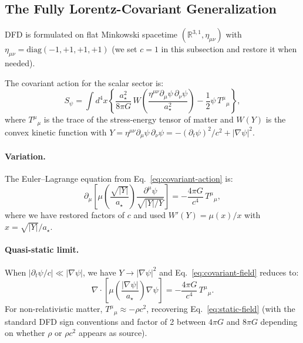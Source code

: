 \documentclass[aps,prd,twocolumn,superscriptaddress,nofootinbib]{revtex4-2}
\begin{document}
\subsection{The Fully Lorentz-Covariant Generalization}

DFD is formulated on flat Minkowski spacetime $(\mathbb{R}^{3,1},
\eta_{\mu\nu})$ with $\eta_{\mu\nu} = \mathrm{diag}(-1,+1,+1,+1)$
(we set $c=1$ in this subsection and restore it when needed).

The covariant action for the scalar sector is:
\begin{equation}\label{eq:covariant-action}
S_\psi = \int d^4x\left\{
  \frac{a_\star^2}{8\pi G}\,
  W\!\left(\frac{\eta^{\mu\nu}\partial_\mu\psi\,\partial_\nu\psi}
  {a_\star^2}\right)
  - \frac{1}{2}\psi\,T^\mu{}_\mu
\right\},
\end{equation}
where $T^\mu{}_\mu$ is the trace of the stress-energy tensor of matter
and $W(Y)$ is the convex kinetic function with $Y = \eta^{\mu\nu}
\partial_\mu\psi\,\partial_\nu\psi = -(\partial_t\psi)^2/c^2 +
|\nabla\psi|^2$.

\paragraph{Variation.} The Euler--Lagrange equation from
Eq.~\eqref{eq:covariant-action} is:
\begin{equation}\label{eq:covariant-field}
\boxed{
\partial_\mu\!\left[\mu\!\left(\frac{\sqrt{|Y|}}{a_\star}\right)
\frac{\partial^\mu\psi}{\sqrt{|Y|/Y}}\right]
= -\frac{4\pi G}{c^4}\,T^\mu{}_\mu,
}
\end{equation}
where we have restored factors of $c$ and used $W'(Y) = \mu(x)/x$
with $x = \sqrt{|Y|}/a_\star$.

\paragraph{Quasi-static limit.} When $|\partial_t\psi/c| \ll
|\nabla\psi|$, we have $Y \to |\nabla\psi|^2$ and Eq.~\eqref{eq:covariant-field}
reduces to:
\begin{equation}
\nabla\cdot\!\left[\mu\!\left(\frac{|\nabla\psi|}{a_\star}\right)
\nabla\psi\right] = -\frac{4\pi G}{c^4}\,T^\mu{}_\mu.
\end{equation}
For non-relativistic matter, $T^\mu{}_\mu \approx -\rho c^2$, recovering
Eq.~\eqref{eq:static-field} (with the standard DFD sign conventions
and factor of 2 between $4\pi G$ and $8\pi G$ depending on whether
$\rho$ or $\rho c^2$ appears as source).
\end{document}
